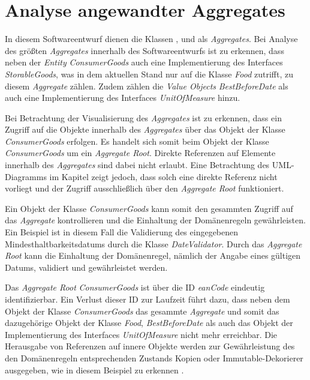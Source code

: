 \section{Analyse angewandter Aggregates}
\label{domaindrivendesign>aggregates}
In diesem Softwareentwurf dienen die Klassen \href{}{}, \href{}{} und \href{}{} als \textit{Aggregates}.
Bei Analyse des größten \textit{Aggregates} innerhalb des Softwareentwurfs ist zu erkennen, dass neben der \textit{Entity} \href{}{\code{}}\textit{ConsumerGoods} auch eine Implementierung des Interfaces \href{}{\code{}}\textit{StorableGoods}, was in dem aktuellen Stand nur auf die Klasse \href{}{\code{}}\textit{Food} zutrifft, zu diesem \textit{Aggregate} zählen. 
Zudem zählen die \textit{Value Objects} \textit{BestBeforeDate} als auch eine Implementierung des Interfaces \textit{UnitOfMeasure} hinzu.


Bei Betrachtung der Visualisierung des \textit{Aggregates} ist zu erkennen, dass ein Zugriff auf die Objekte innerhalb des \textit{Aggregates} über das Objekt der Klasse \href{}{\code{}}\textit{ConsumerGoods} erfolgen.
Es handelt sich somit beim Objekt der Klasse \href{}{\code{}}\textit{ConsumerGoods} um ein \textit{Aggregate Root}.
Direkte Referenzen auf Elemente innerhalb des \textit{Aggregates} sind dabei nicht erlaubt.
Eine Betrachtung des UML-Diagramms im Kapitel \href{}{\code{}} zeigt jedoch, dass solch eine direkte Referenz nicht vorliegt und der Zugriff ausschließlich über den \textit{Aggregate Root} funktioniert.

Ein Objekt der Klasse \href{}{\code{}}\textit{ConsumerGoods} kann somit den gesammten Zugriff auf das \textit{Aggregate} kontrollieren und die Einhaltung der Domänenregeln gewährleisten.
Ein Beispiel ist in diesem Fall die Validierung des eingegebenen Mindesthaltbarkeitsdatums durch die Klasse \href{}{\code{}}\textit{DateValidator}.
Durch das \textit{Aggregate Root} kann die Einhaltung der Domänenregel, nämlich der Angabe eines gültigen Datums, validiert und gewährleistet werden.

Das \textit{Aggregate Root} \textit{ConsumerGoods} ist über die ID \href{}{\code{}}\textit{eanCode} eindeutig identifizierbar.
Ein Verlust dieser ID zur Laufzeit führt dazu, dass neben dem Objekt der Klasse \href{}{\code{}}\textit{ConsumerGoods} das gesammte \textit{Aggregate} und somit das dazugehörige Objekt der Klasse \href{}{\code{}}\textit{Food}, \href{}{\code{}}\textit{BestBeforeDate} als auch das Objekt der Implementierung des Interfaces \textit{UnitOfMeasure} nicht mehr erreichbar.
Die Herausgabe von Referenzen auf innere Objekte werden zur Gewährleistung des den Domänenregeln entsprechenden Zustands Kopien oder Immutable-Dekorierer ausgegeben, wie \href{}{\code{}}in diesem Beispiel zu erkennen .

